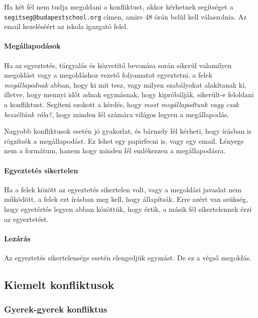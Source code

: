 Ha két fél nem tudja megoldani a konfliktust, akkor kérhetnek segítséget a \texttt{segitseg@budapestschool.org} címen, amire 48 órán belül kell válaszolnia. Az email kezeléséért az iskola igazgató felel.

\paragraph{Megállapodások}

Ha az egyeztetés, tárgyalás és közvetítő bevonása során sikerül valamilyen megoldást vagy a megoldáshoz vezető folyamatot egyeztetni, a felek \emph{megállapodnak} abban, hogy ki mit tesz, vagy milyen szabályokat alakítanak ki, illetve, hogy mennyi időt adnak egymásnak, hogy kipróbálják, sikerült-e feloldani a konfliktust. Segíteni szokott a kérdés, hogy \emph{most megállapodtunk vagy csak beszéltünk róla?}, hogy minden fél számára világos legyen a megállapodás.

Nagyobb konfliktusok esetén jó gyakorlat, és bármely fél kérheti, hogy írásban is rögzítsék a megállapodást. Ez lehet egy papirfecni is, vagy egy email. Lényege nem a formátum, hanem  hogy minden fél emlékezzen a megállapodásra.

\paragraph{Egyeztetés sikertelen}

Ha a felek között az egyeztetés sikertelen volt, vagy a megoldási javaslat nem működött, a felek ezt írásban meg kell, hogy állapítsák. Erre azért van szükség, hogy egyetértés legyen abban közöttük, hogy értik, a másik fél sikertelennek érzi az egyeztetést.

\paragraph{Lezárás}

Az egyeztetés sikertelensége esetén elengedjük egymást. De ez a végső megoldás.

\subsection{Kiemelt konfliktusok}

\subsubsection{Gyerek-gyerek konfliktus}

